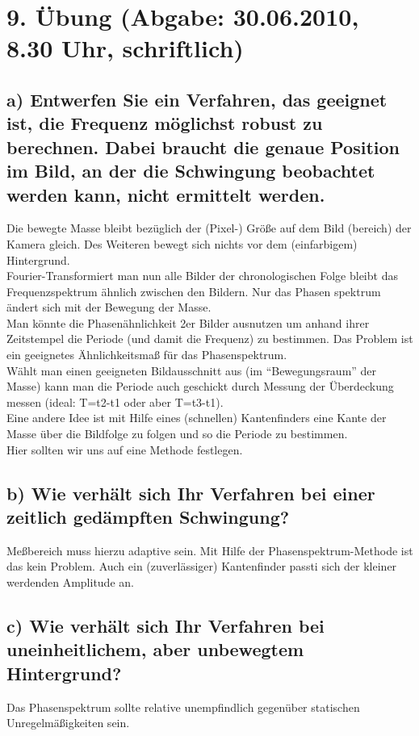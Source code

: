 \section*{9. \"Ubung (Abgabe: 30.06.2010, 8.30 Uhr, schriftlich)}

\subsection*{a) Entwerfen Sie ein Verfahren, das geeignet ist, die Frequenz m\"oglichst robust zu berechnen. Dabei braucht die genaue Position im Bild, an der die Schwingung beobachtet werden kann, nicht ermittelt werden.}
Die bewegte Masse bleibt bez\"uglich der (Pixel-) Gr\"o{\ss}e auf dem Bild (bereich) der Kamera gleich. Des Weiteren bewegt sich nichts vor dem (einfarbigem) Hintergrund. \\
Fourier-Transformiert man nun alle Bilder der chronologischen Folge bleibt das Frequenzspektrum \"ahnlich zwischen den Bildern.
Nur das Phasen spektrum \"andert sich mit der Bewegung der Masse. \\
Man k\"onnte die Phasen\"ahnlichkeit 2er Bilder ausnutzen um anhand ihrer Zeitstempel die Periode (und damit die Frequenz) zu bestimmen. Das Problem ist ein geeignetes \"Ahnlichkeitsma{\ss} f\"ur das Phasenspektrum. \\
W\"ahlt man einen geeigneten Bildausschnitt aus (im ``Bewegungsraum'' der Masse) kann man die Periode auch geschickt durch Messung der \"Uberdeckung messen (ideal: T=t2-t1 oder aber T=t3-t1). \\
Eine andere Idee ist mit Hilfe eines (schnellen) Kantenfinders eine Kante der Masse \"uber die Bildfolge zu folgen und so die Periode zu bestimmen. \\
Hier sollten wir uns auf eine Methode festlegen.

\subsection*{b) Wie verh\"alt sich Ihr Verfahren bei einer zeitlich ged\"ampften Schwingung?}
Me{\ss}bereich muss hierzu adaptive sein.
Mit Hilfe der Phasenspektrum-Methode ist das kein Problem. Auch ein (zuverl\"assiger) Kantenfinder passti sich der kleiner werdenden Amplitude an.

\subsection*{c) Wie verh\"alt sich Ihr Verfahren bei uneinheitlichem, aber unbewegtem Hintergrund?}
Das Phasenspektrum sollte relative unempfindlich gegen\"uber statischen Unregelm\"a{\ss}igkeiten sein.

